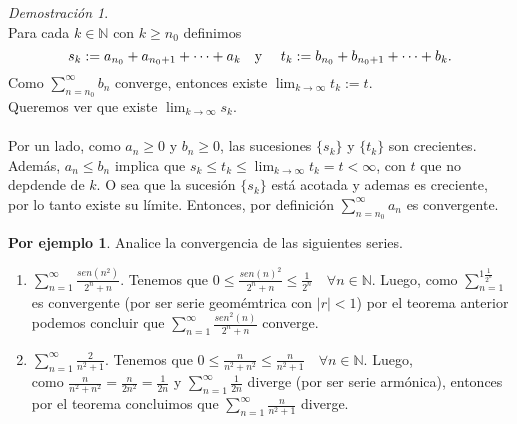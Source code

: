 \documentclass{article}
\theoremstyle{definition}
\newtheorem*{ej}{Por ejemplo}
\theoremstyle{remark}
\newtheorem*{demo}{Demostración}
\begin{document}
\begin{demo} \; \\
  Para cada $k \in \mathbb{N}$ con $k \geq n_0$ definimos $$s_k := a_{n_0}+a_{n_{0}+1}+\dots+a_k \text{\quad y \quad} t_k := b_{n_0}+b_{n_0+1}+\dots+b_k.$$
  Como $\sum_{n=n_0}^{\infty}{b_n}$ converge, entonces existe $\lim_{k \to \infty}{t_k}:=t$.
  \\ 
  Queremos ver que existe $\lim_{k\to\infty}{s_k}.$
\\\\
Por un lado, como $a_n \geq 0$ y $b_n \geq 0$, las sucesiones $\{s_k\}$ y $\{t_k\}$ son crecientes. \\
Además, $a_n \leq b_n$ implica que $s_k \leq t_k \leq \lim_{k \to \infty}{t_k}=t<\infty$, con $t$ que no depdende de $k$. O sea que la sucesión $\{s_k\}$ está acotada y ademas es creciente, por lo tanto existe su límite. Entonces, por definición $\sum_{n=n_0}^{\infty}{a_n}$ es convergente. 

\end{demo}
\pagebreak
\begin{ej}
  Analice la convergencia de las siguientes series.
  \begin{enumerate}
    \item $\sum_{n=1}^{\infty}{\frac{sen(n^2)}{2^n+n}}$. Tenemos que $0 \leq \frac{sen(n)^2}{2^n+n} \leq \frac{1}{2^n}\quad \forall n \in \mathbb{N}.$ Luego, como $\sum_{n=1}^{1\frac{1}{2^n}}$ es convergente (por ser serie geomémtrica con $|r|<1$) por el teorema anterior podemos concluir que $\sum_{n=1}^{\infty}{\frac{sen^2(n)}{2^n+n}}$ converge. \\
    \item $\sum_{n=1}^{\infty}{\frac{2}{n^2+1}}.$ Tenemos que $0 \leq \frac{n}{n^2+n^2}\leq \frac{n}{n^2+1} \quad \forall n \in \mathbb{N}$. Luego, \\
      como $\frac{n}{n^2+n^2}=\frac{n}{2n^2}=\frac{1}{2n}$ y $\sum_{n=1}^{\infty}{\frac{1}{2n}}$ diverge (por ser serie armónica), entonces por el teorema concluimos que $\sum_{n=1}^{\infty}{\frac{n}{n^2+1}}$ diverge.
      
  \end{enumerate}
\end{ej}
\end{document}
